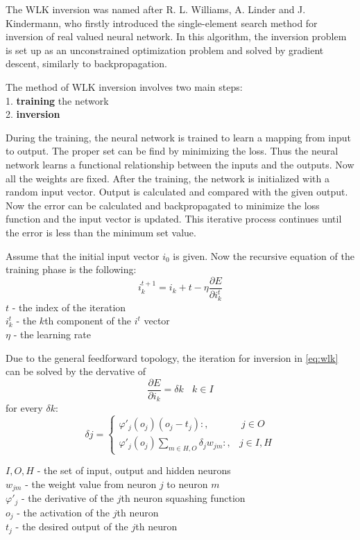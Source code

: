 The WLK inversion was named after R. L. Williams, A. Linder and J.
Kindermann, who firstly introduced the single-element search method for inversion of real valued neural network. In this algorithm, the inversion problem is set up as an unconstrained optimization problem and solved by gradient descent, similarly to backpropagation. \medskip

\noindent The method of WLK inversion involves two main steps: \\
1. \textbf{training} the network \\
2. \textbf{inversion}\medskip

During the training, the neural network is trained to learn a mapping from input to output. The proper set can be find by minimizing the loss. Thus the neural network learns a functional relationship between the inputs and the outputs. Now all the weights are fixed. After the training, the network is initialized with a random input vector. Output is calculated and compared with the given output. Now the error can be calculated and backpropagated to minimize the loss function and the input vector is updated. This iterative process continues until the error is less than the minimum set value.\medskip

Assume that the initial input vector $i_0$ is given. Now the recursive equation of the training phase is the following: 
\begin{equation} i_k^{t+1} = i_k+t - \eta \frac{\partial E}{\partial i_k^t} \label{eq:wlk} \end{equation} 
$t$ - the index of the iteration \\
$i_k^t$ - the $k$th component of the $i^t$ vector \\
$\eta$ - the learning rate \medskip

Due to the general feedforward topology, the iteration for inversion in \eqref{eq:wlk} can be solved by the dervative of 
$$ \frac{\partial E}{\partial i_k} = \delta k ~~~~ k \in I$$
for every $\delta k$:
$$ \delta j = \begin{cases} \varphi'_j(o_j)(o_j-t_j):, & ~ j \in O \\ 
\varphi'_j(o_j)\sum_{m\in H,O}\delta_j w_{jm}:, & j \in I, H \end{cases} $$

\noindent $I, O, H$ - the set of input, output and hidden neurons\\
$w_{jm}$ - the weight value from neuron $j$ to neuron $m$\\
$\varphi'_j$ - the derivative of the $j$th neuron squashing function\\
$o_j$ - the activation of the $j$th neuron\\
$t_j$ - the desired output of the $j$th neuron \medskip

